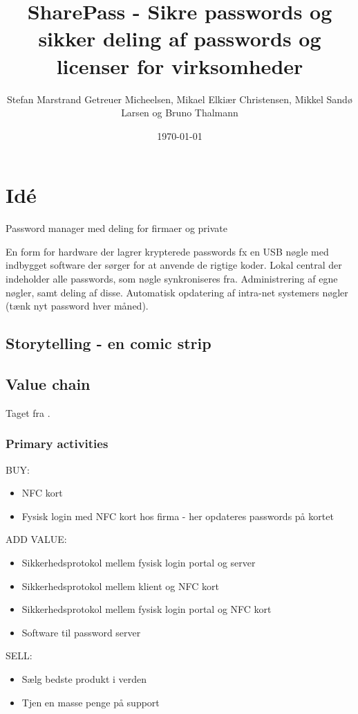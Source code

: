 \documentclass[a4paper]{article}
\title{SharePass - Sikre passwords og sikker deling af passwords og licenser for virksomheder}
\author{Stefan Marstrand Getreuer Micheelsen, Mikael Elkiær Christensen, Mikkel Sandø Larsen og Bruno Thalmann}
\date{\today}
\begin{document}
\maketitle


\section{Idé}
Password manager med deling for firmaer og private

En form for hardware der lagrer krypterede passwords fx en USB nøgle med indbygget software der sørger for at anvende de rigtige koder.
Lokal central der indeholder alle passwords, som nøgle synkroniseres fra.
Administrering af egne nøgler, samt deling af disse.
Automatisk opdatering af intra-net systemers nøgler (tænk nyt password hver måned).

\subsection{Storytelling - en comic strip}

\subsection{Value chain}
Taget fra \citet[p.~12]{rose2012software}.
\subsubsection*{Primary activities}
BUY:
\begin{itemize}
\item NFC kort
\item Fysisk login med NFC kort hos firma - her opdateres passwords på kortet
\end{itemize}
ADD VALUE:
\begin{itemize}
\item Sikkerhedsprotokol mellem fysisk login portal og server
\item Sikkerhedsprotokol mellem klient og NFC kort
\item Sikkerhedsprotokol mellem fysisk login portal og NFC kort
\item Software til password server
\end{itemize}
SELL:
\begin{itemize}
\item Sælg bedste produkt i verden
\item Tjen en masse penge på support
\end{itemize}
\end{document}
